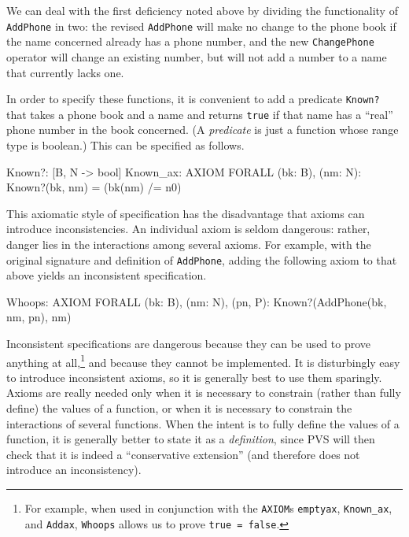 We can deal with the first deficiency noted above by dividing the
functionality of {\tt AddPhone} in two: the revised {\tt AddPhone}
will make no change to the phone book if the name concerned already
has a phone number, and the new {\tt ChangePhone} operator will change
an existing number, but will not add a number to a name that
currently lacks one.

In order to specify these functions, it is convenient to add a
predicate {\tt Known?} that takes a phone book and a name and returns
{\tt true} if that name has a ``real'' phone number in the book
concerned.  (A {\em predicate\/} is just a function whose range type
is boolean.)  This can be specified as follows.
\begin{jmrsession}
  Known?: [B, N -> bool]
  Known_ax: AXIOM   FORALL (bk: B), (nm: N): Known?(bk, nm) = (bk(nm) /= n0)
\end{jmrsession}

This axiomatic style of specification has the disadvantage that axioms
can introduce inconsistencies.  An individual axiom is seldom
dangerous: rather, danger lies in the interactions among several
axioms.  For example, with the original signature and definition of
{\tt AddPhone}, adding the following axiom to that above yields an
inconsistent specification.
\begin{jmrsession}
  Whoops: AXIOM   FORALL (bk: B), (nm: N), (pn, P): Known?(AddPhone(bk, nm, pn), nm)
\end{jmrsession}

Inconsistent specifications are dangerous because they can be used to
prove anything at all,\footnote{For example, when used in conjunction
with the {\tt AXIOM}s {\tt emptyax}, {\tt Known\_ax}, and {\tt Addax},
{\tt Whoops} allows us to prove {\tt true = false}.}
and because they cannot be implemented.  It is
disturbingly easy to introduce inconsistent axioms, so it is generally
best to use them sparingly.  Axioms are really needed only when it is
necessary to constrain (rather than fully define) the values of a
function, or when it is necessary to constrain the interactions of
several functions.  When the intent is to fully define the values of
a function, it is generally better to state it as a {\em definition\/},
since PVS will then check that it is indeed a ``conservative
extension'' (and therefore does not introduce an inconsistency).

